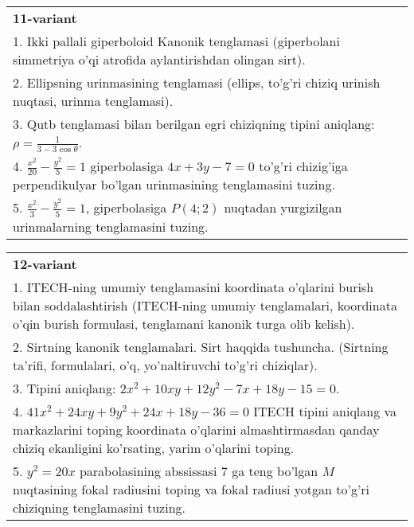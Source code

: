 \documentclass{article}
\begin{document}
\begin{tabular}{m{17cm}}
\textbf{11-variant}\\
1. Ikki pallali giperboloid Kanonik tenglamasi (giperbolani simmetriya o'qi atrofida aylantirishdan olingan sirt).\\

2. Ellipsning urinmasining tenglamasi (ellips, to'g'ri chiziq urinish nuqtasi, urinma tenglamasi).\\

3. Qutb tenglamasi bilan berilgan egri chiziqning tipini aniqlang: $\rho=\frac{1}{3-3\cos\theta}$.\\

4. $\frac{x^{2}}{20} - \frac{y^{2}}{5} = 1$ giperbolasiga $4x + 3y - 7 = 0$ to'g'ri chizig'iga perpendikulyar bo'lgan urinmasining tenglamasini tuzing.  \\

5. $\frac{x^{2}}{3} - \frac{y^{2}}{5} = 1$, giperbolasiga $P(4;2)$ nuqtadan yurgizilgan urinmalarning tenglamasini tuzing.  
\end{tabular}
\vspace{1cm}


\begin{tabular}{m{17cm}}
\textbf{12-variant}\\
1. ITECH-ning umumiy tenglamasini koordinata o'qlarini burish bilan soddalashtirish (ITECH-ning umumiy tenglamalari, koordinata o'qin burish formulasi, tenglamani kanonik turga olib kelish).\\

2. Sirtning kanonik tenglamalari. Sirt haqqida tushuncha. (Sirtning ta'rifi, formulalari, o'q, yo'naltiruvchi to'g'ri chiziqlar).\\

3. Tipini aniqlang: $2x^{2}+10xy+12y^{2}-7x+18y-15=0$.\\

4. $41x^{2} + 24xy + 9y^{2} + 24x + 18y - 36 = 0$ ITECH tipini aniqlang va markazlarini toping koordinata o'qlarini almashtirmasdan qanday chiziq ekanligini ko'rsating, yarim o'qlarini toping.  \\

5. $y^{2} = 20x$ parabolasining abssissasi 7 ga teng bo'lgan $M$ nuqtasining fokal radiusini toping va fokal radiusi yotgan to'g'ri chiziqning tenglamasini tuzing.  
\end{tabular}
\vspace{1cm}
\end{document}
